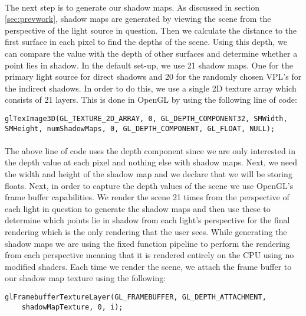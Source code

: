 \paragraph{}
The next step is to generate our shadow maps.  As discussed in section \ref{sec:prevwork}, shadow maps are generated by viewing the scene from the perspective of the light source in question.  Then we calculate the distance to the first surface in each pixel to find the depths of the scene.  Using this depth, we can compare the value with the depth of other surfaces and determine whether a point lies in shadow.  In the default set-up, we use 21 shadow maps. One for the primary light source for direct shadows and 20 for the randomly chosen VPL's for the indirect shadows.  In order to do this, we use a single 2D texture array which consists of 21 layers.  This is done in OpenGL by using the following line of code:

\begin{lstlisting}
glTexImage3D(GL_TEXTURE_2D_ARRAY, 0, GL_DEPTH_COMPONENT32, SMWidth, 
SMHeight, numShadowMaps, 0, GL_DEPTH_COMPONENT, GL_FLOAT, NULL);
\end{lstlisting}

\paragraph{}
The above line of code uses the depth component since we are only interested in the depth value at each pixel and nothing else with shadow maps.  Next, we need the width and height of the shadow map and we declare that we will be storing floats.  Next, in order to capture the depth values of the scene we use OpenGL's frame buffer capabilities.  We render the scene 21 times from the perspective of each light in question to generate the shadow maps and then use these to determine which points lie in shadow from each light's perspective for the final rendering which is the only rendering that the user sees.  While generating the shadow maps we are using the fixed function pipeline to perform the rendering from each perspective meaning that it is rendered entirely on the CPU using no modified shaders.  Each time we render the scene, we attach the frame buffer to our shadow map texture using the following:

\begin{lstlisting}
glFramebufferTextureLayer(GL_FRAMEBUFFER, GL_DEPTH_ATTACHMENT, 
	shadowMapTexture, 0, i);
\end{lstlisting}

